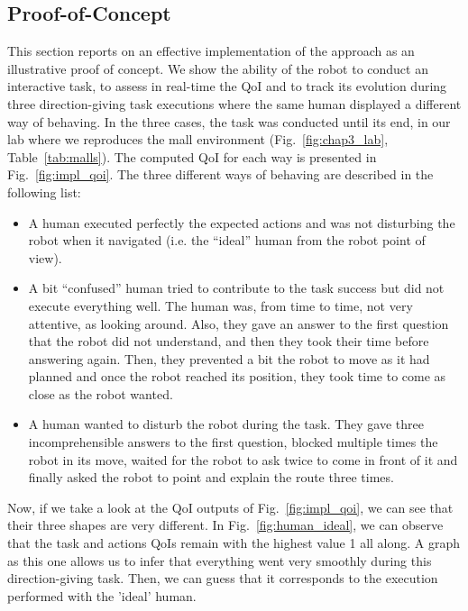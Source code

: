 \documentclass[a4paper,11pt,twoside]{StyleThese}
\begin{document}
\subsection{Proof-of-Concept}\label{subsec:results}
This section reports on an effective implementation of the approach as an illustrative proof of concept. We show the ability of the robot to conduct an interactive task, to assess in real-time the QoI and to track its evolution during three direction-giving task executions where the same human displayed a different way of behaving. In the three cases, the task was conducted until its end, in our lab where we reproduces the mall environment (Fig.~\ref{fig:chap3_lab}, Table~\ref{tab:malls}). The computed QoI for each way is presented in Fig.~\ref{fig:impl_qoi}. The three different ways of behaving are described in the following list:
\begin{itemize}
	\item A human executed perfectly the expected actions and was not disturbing the robot when it navigated (i.e. the ``ideal'' human from the robot point of view). 
	\item A bit ``confused'' human tried to contribute to the task success but did not execute everything well. The human was, from time to time, not very attentive, as looking around. Also, they gave an answer to the first question that the robot did not understand, and then they took their time before answering again. Then, they prevented a bit the robot to move as it had planned and once the robot reached its position, they took time to come as close as the robot wanted. 
	\item A human wanted to disturb the robot during the task. They gave three incomprehensible answers to the first question, blocked multiple times the robot in its move, waited for the robot to ask twice to come in front of it and finally asked the robot to point and explain the route three times. 
\end{itemize}

Now, if we take a look at the QoI outputs of Fig.~\ref{fig:impl_qoi}, we can see that their three shapes are very different. In Fig.~\ref{fig:human_ideal}, we can observe that the task and actions QoIs remain with the highest value 1 all along. A graph as this one allows us to infer that everything went very smoothly during this direction-giving task. Then, we can guess that it corresponds to the execution performed with the 'ideal' human. 
\end{document}
